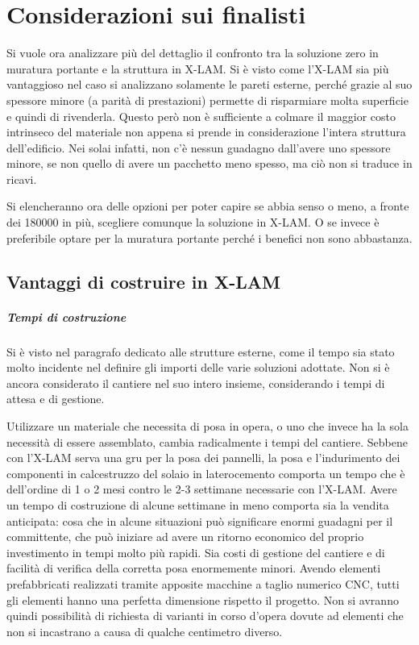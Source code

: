 \chapter{Considerazioni sui finalisti}
Si vuole ora analizzare più del dettaglio il confronto tra la soluzione zero in muratura portante e la struttura in X-LAM. 
Si è visto come l'X-LAM sia più vantaggioso nel caso si analizzano solamente le pareti esterne, perché grazie al suo spessore minore (a parità di prestazioni) permette di risparmiare molta superficie e quindi di rivenderla.
Questo però non è sufficiente a colmare il maggior costo intrinseco del materiale non appena si prende in considerazione l'intera struttura dell'edificio. 
Nei solai infatti, non c'è nessun guadagno dall'avere uno spessore minore, se non quello di avere un pacchetto meno spesso, ma ciò non si traduce in ricavi.

Si elencheranno ora delle opzioni per poter capire se abbia senso o meno, a fronte dei \SI{180000}{\teuro} in più, scegliere comunque la soluzione in X-LAM. 
O se invece è preferibile optare per la muratura portante perché i benefici non sono abbastanza.
\section{Vantaggi di costruire in X-LAM}
\paragraph{Tempi di costruzione}
Si è visto nel paragrafo dedicato alle strutture esterne, come il tempo sia stato molto incidente nel definire gli importi delle varie soluzioni adottate.
Non si è ancora considerato il cantiere nel suo intero insieme, considerando i tempi di attesa e di gestione.

Utilizzare un materiale che necessita di posa in opera, o uno che invece ha la sola necessità di essere assemblato, cambia radicalmente i tempi del cantiere.
Sebbene con l'X-LAM serva una gru per la posa dei pannelli, la posa e l'indurimento dei componenti in calcestruzzo del solaio in laterocemento comporta un tempo che è dell'ordine di 1 o 2 mesi contro le 2-3 settimane necessarie con l'X-LAM. 
Avere un tempo di costruzione di alcune settimane in meno comporta sia la vendita anticipata: cosa che in alcune situazioni può significare enormi guadagni per il committente, che può iniziare ad avere un ritorno economico del proprio investimento in tempi molto più rapidi.
Sia costi di gestione del cantiere e di facilità di verifica della corretta posa enormemente minori. Avendo elementi prefabbricati realizzati tramite apposite macchine a taglio numerico CNC, tutti gli elementi hanno una perfetta dimensione rispetto il progetto. Non si avranno quindi possibilità di richiesta di varianti in corso d'opera dovute ad elementi che non si incastrano a causa di qualche centimetro diverso.

